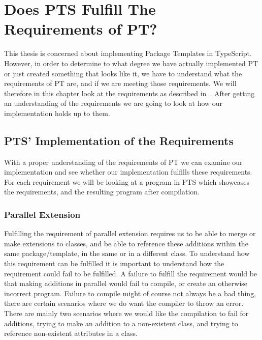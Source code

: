 \section{Does PTS Fulfill The Requirements of PT?}\label{sec:does-pts-fulfill-the-requirements-of-pt?}

This thesis is concerned about implementing Package Templates in TypeScript.
However, in order to determine to what degree we have actually implemented PT or just created something that looks like it, we have to understand what the requirements of PT are, and if we are meeting those requirements.
We will therefore in this chapter look at the requirements as described in~\cite{jot}.
After getting an understanding of the requirements we are going to look at how our implementation holds up to them.



\subsection{PTS' Implementation of the Requirements}\label{subsec:pts'-implementation-of-the-requirements}

With a proper understanding of the requirements of PT we can examine our implementation and see whether our implementation fulfills these requirements.
For each requirement we will be looking at a program in PTS which showcases the requirements, and the resulting program after compilation.


\subsubsection{Parallel Extension}\label{subsubsec:pts-parallel-extension}

Fulfilling the requirement of parallel extension requires us to be able to merge or make extensions to classes, and be able to reference these additions within the same package/template, in the same or in a different class.
To understand how this requirement can be fulfilled it is important to understand how the requirement could fail to be fulfilled.
A failure to fulfill the requirement would be that making additions in parallel would fail to compile, or create an otherwise incorrect program.
Failure to compile might of course not always be a bad thing, there are certain scenarios where we do want the compiler to throw an error.
There are mainly two scenarios where we would like the compilation to fail for additions, trying to make an addition to a non-existent class, and trying to reference non-existent attributes in a class.

